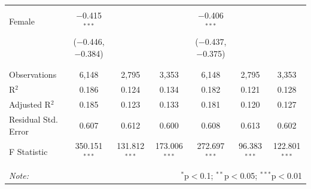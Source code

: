 \documentclass[12pt,a4paper]{article}
\numberwithin{equation}{section}
\begin{document}
\begin{landscape}
\begin{table}[!htbp]
\begin{tabular}{@{\extracolsep{5pt}}lcccccc}
			& & & & & & \\ 
			Female & $-$0.415$^{***}$ &  &  & $-$0.406$^{***}$ &  &  \\ 
			& ($-$0.446, $-$0.384) &  &  & ($-$0.437, $-$0.375) &  &  \\ 
			& & & & & & \\ 
			\hline \\[-1.8ex] 
			Observations & 6,148 & 2,795 & 3,353 & 6,148 & 2,795 & 3,353 \\ 
			R$^{2}$ & 0.186 & 0.124 & 0.134 & 0.182 & 0.121 & 0.128 \\ 
			Adjusted R$^{2}$ & 0.185 & 0.123 & 0.133 & 0.181 & 0.120 & 0.127 \\ 
			Residual Std. Error & 0.607 & 0.612 & 0.600 & 0.608 & 0.613 & 0.602 \\ 
			F Statistic & 350.151$^{***}$ & 131.812$^{***}$ & 173.006$^{***}$ & 272.697$^{***}$ & 96.383$^{***}$ & 122.801$^{***}$ \\ 
			\hline 
			\hline \\[-1.8ex] 
			\textit{Note:}  & \multicolumn{6}{r}{$^{*}$p$<$0.1; $^{**}$p$<$0.05; $^{***}$p$<$0.01} \\ 
		\end{tabular} 
	\end{table} 
	
\end{landscape}

\newpage
\end{document}
